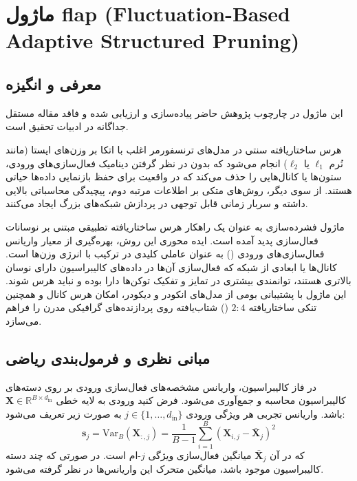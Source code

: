 \section{ماژول flap (Fluctuation-Based Adaptive Structured Pruning)}
\label{sec:module_flap}

\subsection{معرفی و انگیزه}
این ماژول در چارچوب پژوهش حاضر پیاده‌سازی و ارزیابی شده و فاقد مقاله مستقل جداگانه در ادبیات تحقیق است.

هرس ساختاریافته سنتی در مدل‌های ترنسفورمر اغلب با اتکا بر وزن‌های ایستا (مانند نُرم $\ell_1$ یا $\ell_2$) انجام می‌شود که بدون در نظر گرفتن دینامیک فعال‌سازی‌های ورودی، ستون‌ها یا کانال‌هایی را حذف می‌کند که در واقعیت برای حفظ بازنمایی داده‌ها حیاتی هستند. از سوی دیگر، روش‌های متکی بر اطلاعات مرتبه دوم، پیچیدگی محاسباتی بالایی داشته و سربار زمانی قابل توجهی در پردازش شبکه‌های بزرگ ایجاد می‌کنند.

ماژول فشرده‌سازی  به عنوان یک راهکار هرس ساختاریافته تطبیقی مبتنی بر نوسانات فعال‌سازی پدید آمده است. ایده محوری این روش، بهره‌گیری از معیار واریانس فعال‌سازی‌های ورودی () به عنوان عاملی کلیدی در ترکیب با انرژی وزن‌ها است. کانال‌ها یا ابعادی از شبکه که فعال‌سازی آن‌ها در داده‌های کالیبراسیون دارای نوسان بالاتری هستند، توانمندی بیشتری در تمایز و تفکیک توکن‌ها دارا بوده و نباید هرس شوند. این ماژول با پشتیبانی بومی از مدل‌های انکودر و دیکودر، امکان هرس کانال و همچنین تنکی ساختاریافته $2:4$ () شتاب‌یافته روی پردازنده‌های گرافیکی مدرن را فراهم می‌سازد.

\subsection{مبانی نظری و فرمول‌بندی ریاضی}
در فاز کالیبراسیون، واریانس مشخصه‌های فعال‌سازی ورودی بر روی دسته‌های کالیبراسیون محاسبه و جمع‌آوری می‌شود. فرض کنید ورودی به لایه خطی $\mathbf{X} \in \mathbb{R}^{B \times d_{\text{in}}}$ باشد. واریانس تجربی هر ویژگی ورودی $j \in \{1, \dots, d_{\text{in}}\}$ به صورت زیر تعریف می‌شود:
\begin{equation}
\mathbf{s}_j = \text{Var}_B(\mathbf{X}_{:, j}) = \frac{1}{B - 1} \sum_{i=1}^B (\mathbf{X}_{i, j} - \bar{\mathbf{X}}_j)^2
\end{equation}
که در آن $\bar{\mathbf{X}}_j$ میانگین فعال‌سازی ویژگی $j$-ام است. در صورتی که چند دسته کالیبراسیون موجود باشد، میانگین متحرک این واریانس‌ها در نظر گرفته می‌شود.

